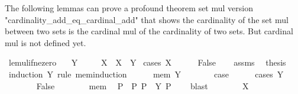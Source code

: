 \begin{isabellebody}
\begin{isamarkuptext}
The following lemmas can prove a profound theorem 
set mul version "cardinality\_add\_eq\_cardinal\_add" that 
shows the cardinality of the set mul between two sets is 
the cardinal mul of the cardinality of two sets.
But cardinal mul is not defined yet.%
\end{isamarkuptext}\isamarkuptrue%
%
\isadelimdocument
%
\endisadelimdocument
%
\isatagdocument
%
\isamarkuptrue%
%
\endisatagdocument
{\isafolddocument}%
%
\isadelimdocument
%
\endisadelimdocument
{}\isamarkupfalse%
\ le{\isacharunderscore}{\kern0pt}mul{\isacharunderscore}{\kern0pt}if{\isacharunderscore}{\kern0pt}ne{\isacharunderscore}{\kern0pt}zero{\isacharcolon}{\kern0pt}\isanewline
\ \ \ {\isachardoublequoteopen}Y\ {\isasymnoteq}\ {}{\isachardoublequoteclose}\isanewline
\ \ \ {\isachardoublequoteopen}X\ {\isasymle}\ X\ {\isacharasterisk}{\kern0pt}\ Y{\isachardoublequoteclose}\isanewline
%
\isadelimproof
%
\endisadelimproof
%
\isatagproof
{}\isamarkupfalse%
\ {\isacharparenleft}{\kern0pt}cases\ {\isachardoublequoteopen}X\ {\isacharequal}{\kern0pt}\ {}{\isachardoublequoteclose}{\isacharparenright}{\kern0pt}\isanewline
\ \ \isamarkupfalse%
\ False\isanewline
\ \ \isamarkupfalse%
\ assms\ \isamarkupfalse%
\ {\isacharquery}{\kern0pt}thesis\isanewline
\ \ \isamarkupfalse%
\ {\isacharparenleft}{\kern0pt}induction\ Y\ rule{\isacharcolon}{\kern0pt}\ mem{\isacharunderscore}{\kern0pt}induction{\isacharparenright}{\kern0pt}\isanewline
\ \ \ \ \isamarkupfalse%
\ {\isacharparenleft}{\kern0pt}mem\ Y{\isacharparenright}{\kern0pt}\isanewline
\ \ \ \ \isamarkupfalse%
\ \isamarkupfalse%
\ {\isacharquery}{\kern0pt}case\isanewline
\ \ \ \ \isamarkupfalse%
\ {\isacharparenleft}{\kern0pt}cases\ {\isachardoublequoteopen}Y\ {\isacharequal}{\kern0pt}\ {}{\isachardoublequoteclose}{\isacharparenright}{\kern0pt}\isanewline
\ \ \ \ \ \ \isamarkupfalse%
\ False\isanewline
\ \ \ \ \ \ \isamarkupfalse%
\ mem\ \isamarkupfalse%
\ P\ \ P{\isacharcolon}{\kern0pt}\ {\isachardoublequoteopen}P\ {\isasymin}\ Y{\isachardoublequoteclose}\ {\isachardoublequoteopen}P\ {\isasymnoteq}\ {}{\isachardoublequoteclose}\ \isamarkupfalse%
\ blast\isanewline
\ \ \ \ \ \ \isamarkupfalse%
\ {\isacartoucheopen}X\ {\isasymnoteq}\ {}{\isacartoucheclose}\ \isamarkupfalse%

\end{isabellebody}
